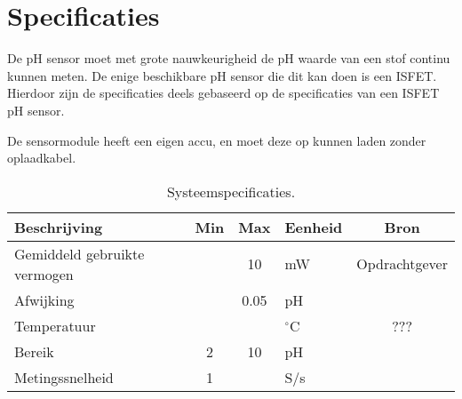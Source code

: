 \section{Specificaties}
De pH sensor moet met grote nauwkeurigheid de pH waarde van een stof continu kunnen meten. 
De enige beschikbare pH sensor die dit kan doen is een ISFET.
Hierdoor zijn de specificaties deels gebaseerd op de specificaties van een ISFET pH sensor.

De sensormodule heeft een eigen accu, en moet deze op kunnen laden zonder oplaadkabel.

\begin{table}[ht]
    \centering
    \begin{tabular}{|l|c c|l|c|}
        \hline
        Beschrijving                 & Min & Max  & Eenheid   & Bron \\
        \hline 
        Gemiddeld gebruikte vermogen &     & 10   & mW        & Opdrachtgever \\
        Afwijking                    &     & 0.05 & pH        & \cite{isfet} \\ 
        Temperatuur                  &     &      & $^\circ$C & ???           \\
        Bereik                       & 2   & 10   & pH        & \cite{isfet} \\
        Metingssnelheid              & 1   &      & S/s       & \cite{isfet} \\
        \hline
    \end{tabular}
    \caption{Systeemspecificaties.}
    \label{tab:systemSpecs}
\end{table}




